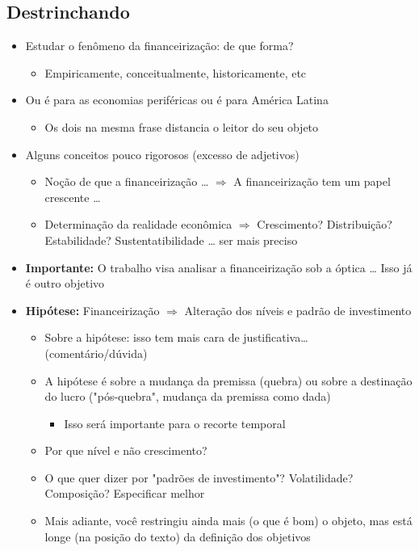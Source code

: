 \documentclass[11pt]{article}
\begin{document}
\subsection*{Destrinchando}
\label{sec:org2aaba06}

\begin{itemize}
\item Estudar o fenômeno da financeirização: de que forma?
\begin{itemize}
\item Empiricamente, conceitualmente, historicamente, etc
\end{itemize}
\item Ou é para as economias periféricas ou é para América Latina
\begin{itemize}
\item Os dois na mesma frase distancia o leitor do seu objeto
\end{itemize}
\item Alguns conceitos pouco rigorosos (excesso de adjetivos)
\begin{itemize}
\item Noção de que a financeirização \ldots{} \(\Rightarrow\) A financeirização tem um papel crescente \ldots{}
\item Determinação da realidade econômica \(\Rightarrow\) Crescimento? Distribuição? Estabilidade? Sustentatibilidade \ldots{} ser mais preciso
\end{itemize}
\item \textbf{Importante:} O trabalho visa analisar a financeirização sob a óptica \ldots{} Isso já é outro objetivo
\item \textbf{Hipótese:} Financeirização \(\Rightarrow\) Alteração dos níveis e padrão de investimento
\begin{itemize}
\item Sobre a hipótese: isso tem mais cara de justificativa\ldots{} (comentário/dúvida)
\item A hipótese é sobre a mudança da premissa (quebra) ou sobre a destinação do lucro ("pós-quebra", mudança da premissa como dada)
\begin{itemize}
\item Isso será importante para o recorte temporal
\end{itemize}
\item Por que nível e não crescimento?
\item O que quer dizer por "padrões de investimento"? Volatilidade? Composição? Especificar melhor
\item Mais adiante, você restringiu ainda mais (o que é bom) o objeto, mas está longe (na posição do texto) da definição dos objetivos

\end{itemize}
\end{itemize}
\end{document}
